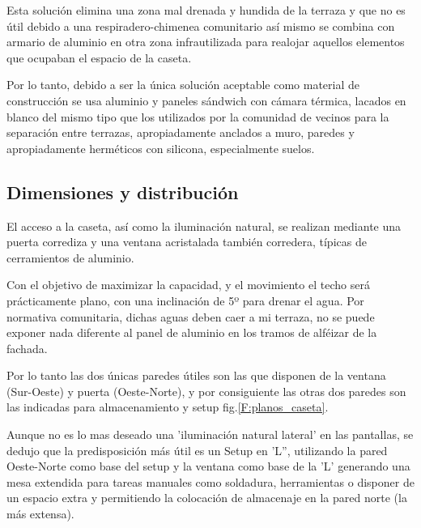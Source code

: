 Esta solución elimina una zona mal drenada y hundida de la terraza y que no es útil debido a una respiradero-chimenea comunitario así mismo se combina con armario de aluminio en otra zona infrautilizada para realojar aquellos elementos que ocupaban el espacio de la caseta.

Por lo tanto, debido a ser la única solución aceptable como material de construcción se usa aluminio y paneles sándwich con cámara térmica, lacados en blanco del mismo tipo que los utilizados por la comunidad de vecinos para la separación entre terrazas, apropiadamente anclados a muro, paredes y apropiadamente herméticos con silicona, especialmente suelos.

\subsection{Dimensiones y distribución}

El acceso a la caseta, así como la iluminación natural, se realizan mediante una puerta corrediza y una ventana acristalada también corredera, típicas de cerramientos de aluminio.

Con el objetivo de maximizar la capacidad, y el movimiento el techo será prácticamente plano, con una inclinación de 5º para drenar el agua. Por normativa comunitaria, dichas aguas deben caer a mi terraza, no se puede exponer nada diferente al panel de aluminio en los tramos de alféizar de la fachada.

Por lo tanto las dos únicas paredes útiles son las que disponen de la ventana (Sur-Oeste) y puerta (Oeste-Norte), y por consiguiente las otras dos paredes son las indicadas para almacenamiento y setup fig.\ref{F:planos_caseta}.

 Aunque no es lo mas deseado una 'iluminación natural lateral' en las pantallas, se dedujo que la predisposición más útil es un Setup en 'L'', utilizando la pared Oeste-Norte como base del setup y la ventana como base de la 'L' generando una mesa extendida para tareas manuales como soldadura, herramientas o disponer de un espacio extra y permitiendo la colocación de almacenaje en la pared norte (la más extensa).


